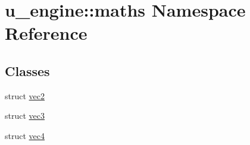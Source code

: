 \hypertarget{namespaceu__engine_1_1maths}{}\section{u\+\_\+engine\+:\+:maths Namespace Reference}
\label{namespaceu__engine_1_1maths}
\subsection*{Classes}
\begin{DoxyCompactItemize}
\item 
struct \hyperlink{structu__engine_1_1maths_1_1vec2}{vec2}
\item 
struct \hyperlink{structu__engine_1_1maths_1_1vec3}{vec3}
\item 
struct \hyperlink{structu__engine_1_1maths_1_1vec4}{vec4}
\end{DoxyCompactItemize}
